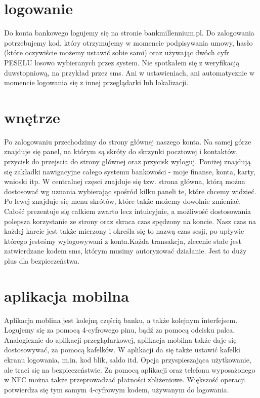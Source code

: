 \documentclass{article}
\begin{document}
 \section{logowanie}
 Do konta bankowego logujemy się na stronie bankmillennium.pl. Do zalogowania potrzebujemy kod, który otrzymujemy w momencie podpisywania umowy, hasło (które oczywiście możemy ustawić sobie sami) oraz używając dwóch cyfr PESELU losowo wybieranych przez system. Nie spotkałem się z weryfikacją duwstopniową, na przykład przez sms. Ani w ustawieniach, ani automatycznie w momencie logowania się z innej przeglądarki lub lokalizacji.
 \section{wnętrze}
 Po zalogowaniu przechodzimy do strony głównej naszego konta. Na samej górze znajduje się panel, na którym są skróty do skrzynki pocztowej i kontaktów, przycisk do przejscia do strony głównej oraz przycisk wyloguj. Poniżej znajdują się zakładki nawigacyjne całego systemu bankowości - moje finanse, konta, karty, wnioski itp. W centralnej częsci znajduje się tzw. strona główna, którą można dostosować wg uznania wybierając spośród kilku paneli te, które chcemy widzieć. Po lewej znajduje się menu skrótów, które także możemy dowolnie zmieniać. Całość prezentuje się całkiem zwarto lecz intuicyjnie, a możliwość dostosowania polepsza korzystanie ze strony oraz skraca czas spędzony na koncie. Nasz czas na każdej karcie jest także mierzony i określa się to nazwą czas sesji, po upływie którego jesteśmy wylogowywani z konta.\newline Każda transakcja, zlecenie stałe jest zatwierdzane kodem sms, którym musimy autoryzować działanie. Jest to duży plus dla bezpieczeństwa.
 \section{aplikacja mobilna}
 Aplikacja moblina jest kolejną częścią banku, a także kolejnym interfejsem. Logujemy się za pomocą 4-cyfrowego pinu, bądź za pomocą odcisku palca. Analogicznie do aplikacji przeglądarkowej, aplikacja mobilna także daje się dostosowywać, za pomocą kafelków. W aplikacji da się także ustawić kafelki ekranu logowania, m.in. kod blik, saldo itd. Opcja przyspieszająca użytkowanie, ale traci się na bezpieczeństwie. Za pomocą aplikacji oraz telefonu wyposażonego w NFC można także przeprowadzać płatności zbliżeniowe. Większość operacji potwierdza się tym samym 4-cyfrowym kodem, używanym do logowania.
 
\end{document}
